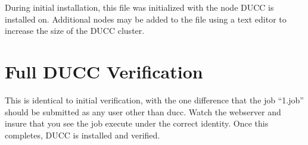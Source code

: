    During initial installation, this file was initialized with the node DUCC is installed on.
   Additional nodes may be added to the file using a text editor to increase the size of the DUCC
   cluster.
 
\section{Full DUCC Verification}

This is identical to initial verification, with the one difference that the job ``1.job'' should be
submitted as any user other than ducc.  Watch the webserver and insure that you see the job execute
under the correct identity.  Once this completes, DUCC is installed and verified.

